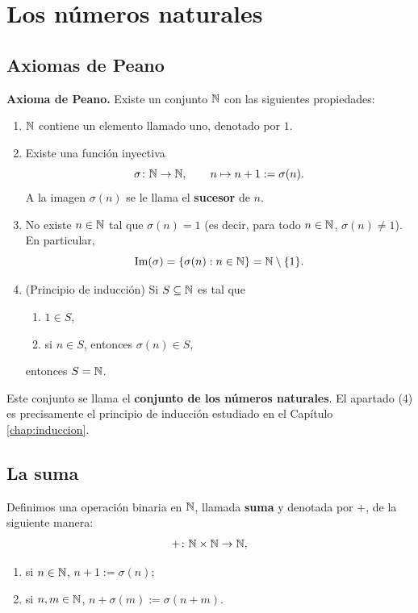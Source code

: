 \documentclass[12pt,a4paper]{book}
\begin{document}
    \section{Los números naturales}

    \subsection{Axiomas de Peano}

    \medskip
    \noindent\textbf{Axioma de Peano.} Existe un conjunto $\mathbb{N}$ con las siguientes propiedades:
    \begin{enumerate}
        \item[(1)] $\mathbb{N}$ contiene un elemento llamado uno, denotado por $1$.
        \item[(2)] Existe una función inyectiva
        \begin{equation*}
            \sigma \colon \mathbb{N} \to \mathbb{N}, \qquad n \mapsto n+1 := \sigma(n).
        \end{equation*}
        A la imagen $\sigma(n)$ se le llama el \textbf{sucesor} de $n$.
        \item[(3)] No existe $n \in \mathbb{N}$ tal que $\sigma(n) = 1$ (es decir, para todo $n \in \mathbb{N}$, $\sigma(n) \ne 1$). En particular,
        \begin{equation*}
            \operatorname{Im}(\sigma) = \{\sigma(n) : n \in \mathbb{N}\} = \mathbb{N} \setminus \{1\}.
        \end{equation*}
        \item[(4)] (Principio de inducción) Si $S \subseteq \mathbb{N}$ es tal que
        \begin{enumerate}
            \item[(a)] $1 \in S$,
            \item[(b)] si $n \in S$, entonces $\sigma(n) \in S$,
        \end{enumerate}
        entonces $S = \mathbb{N}$.
    \end{enumerate}
    Este conjunto se llama el \textbf{conjunto de los números naturales}. El apartado (4) es precisamente el principio de inducción estudiado en el Capítulo \ref{chap:induccion}.
    \medskip

    \subsection{La suma}

    \begin{definicion}[Suma]
        Definimos una operación binaria en $\mathbb{N}$, llamada \textbf{suma} y denotada por $+$, de la siguiente manera:
        \begin{equation*}
            +\colon \mathbb{N} \times \mathbb{N} \to \mathbb{N},
        \end{equation*}
        \begin{enumerate}
            \item[(1)] si $n \in \mathbb{N}$, $n+1 := \sigma(n)$;
            \item[(2)] si $n,m \in \mathbb{N}$, $n + \sigma(m) := \sigma(n+m)$.
        \end{enumerate}
    \end{definicion}
\end{document}

